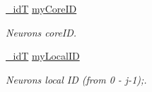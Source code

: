 {\bf }\par
\begin{DoxyCompactItemize}
\item 
\hyperlink{assist_8h_a3f7a6e6a1210b6d9d7a42177dcb9634b}{\+\_\+id\+T} \hyperlink{structneuron_state_a76ef99e5766b6e36c3f41a2920e8c56c}{my\+Core\+I\+D}
\begin{DoxyCompactList}\small\item\em Neuron\textquotesingle{}s core\+I\+D. \end{DoxyCompactList}\item 
\hyperlink{assist_8h_a3f7a6e6a1210b6d9d7a42177dcb9634b}{\+\_\+id\+T} \hyperlink{structneuron_state_ac24762c24aede292a2ce5df78114881c}{my\+Local\+I\+D}
\begin{DoxyCompactList}\small\item\em Neuron\textquotesingle{}s local I\+D (from 0 -\/ j-\/1);. \end{DoxyCompactList}\end{DoxyCompactItemize}

